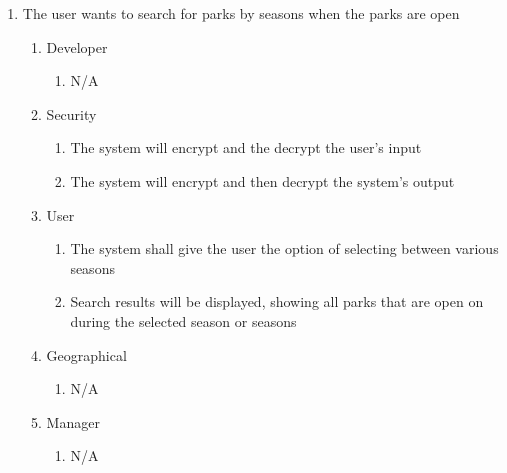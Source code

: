 \documentclass[titlepage]{article}
\begin{document}
\begin{enumerate}[{BE}1.]
    \item The user wants to search for parks by seasons when the parks are open
    \begin{enumerate}[{VP\theenumi}.1]
        \item Developer
            \begin{enumerate}
                \item N/A
            \end{enumerate}
        \item Security
            \begin{enumerate}
                \item The system will encrypt and the decrypt the user's input
                \item The system will encrypt and then decrypt the system's output
            \end{enumerate}
        \item User
            \begin{enumerate}
                \item The system shall give the user the option of selecting between various seasons
                \item Search results will be displayed, showing all parks that are open on during
                the selected season or seasons
            \end{enumerate}
        \item Geographical
            \begin{enumerate}
                \item N/A
            \end{enumerate}
        \item Manager
            \begin{enumerate}
                \item N/A
            \end{enumerate}
    \end{enumerate}


\end{enumerate}
\end{document}
